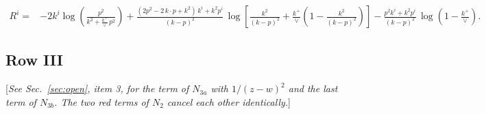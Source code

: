 \documentclass[9pt]{article}
\numberwithin{equation}{section}
\newcommand{\rnote}[1]{{\color{teal}[\textit{#1}]}}
\begin{document}
\begin{align}
R^{i} =& -2k^{i}\log\left(\frac{p^{2}}{k^{2}+\frac{k^{+}}{\vee}\,p^{2}}\right)
+\frac{(2p^{2}-2\,k\cdot p+k^{2})\,k^{i}+k^{2}p^{i}}{(k-p)^{2}}\,
\log\left[\frac{k^{2}}{(k-p)^{2}}+\frac{k^{+}}{\vee}\left(1-\frac{k^{2}}{(k-p)^{2}}\right)\right]
-\frac{p^{2}k^{i}+k^{2}p^{i}}{(k-p)^{2}}\,\log\left(1-\frac{k^{+}}{\vee}\right).
\end{align}

\subsection{Row III}

\rnote{See Sec.~\ref{sec:open}, item 3, for the term of $N_{3a}$ with $1/(z-w)^{2}$ and the last term of $N_{3b}$. The two red terms of $N_{2}$ cancel each other identically.}
\end{document}
